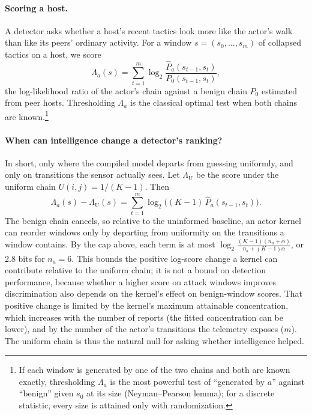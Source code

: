 \documentclass[letterpaper]{article} %
\begin{document}
\paragraph{Scoring a host.} A detector asks whether a host's recent tactics look more like the actor's walk than like its peers' ordinary activity. For a window $s=(s_0,\ldots,s_m)$ of collapsed tactics on a host, we score
\begin{equation}
\Lambda_a(s)=\sum_{t=1}^{m}\log_2\frac{\hat P_a(s_{t-1},s_t)}{P_0(s_{t-1},s_t)},
\label{eq:lr}
\end{equation}
the log-likelihood ratio of the actor's chain against a benign chain $P_0$ estimated from peer hosts. Thresholding $\Lambda_a$ is the classical optimal test when both chains are known.\footnote{If each window is generated by one of the two chains and both are known exactly, thresholding $\Lambda_a$ is the most powerful test of ``generated by $a$'' against ``benign'' given $s_0$ at its size (Neyman--Pearson lemma); for a discrete statistic, every size is attained only with randomization.}

\paragraph{When can intelligence change a detector's ranking?} In short, only where the compiled model departs from guessing uniformly, and only on transitions the sensor actually sees. Let $\Lambda_{\mathrm{U}}$ be the score under the uniform chain $U(i,j)=1/(K-1)$. Then
\begin{equation}
\Lambda_a(s)-\Lambda_{\mathrm{U}}(s)=\sum_{t=1}^{m}\log_2\bigl((K-1)\,\hat P_a(s_{t-1},s_t)\bigr).
\label{eq:diff}
\end{equation}
The benign chain cancels, so relative to the uninformed baseline, an actor kernel can reorder windows only by departing from uniformity on the transitions a window contains. By the cap above, each term is at most $\log_2\frac{(K-1)(n_a+\alpha)}{n_a+(K-1)\alpha}$, or 2.8 bits for $n_a=6$. This bounds the positive log-score change a kernel can contribute relative to the uniform chain; it is not a bound on detection performance, because whether a higher score on attack windows improves discrimination also depends on the kernel's effect on benign-window scores. That positive change is limited by the kernel's maximum attainable concentration, which increases with the number of reports (the fitted concentration can be lower), and by the number of the actor's transitions the telemetry exposes ($m$). The uniform chain is thus the natural null for asking whether intelligence helped.
\end{document}
